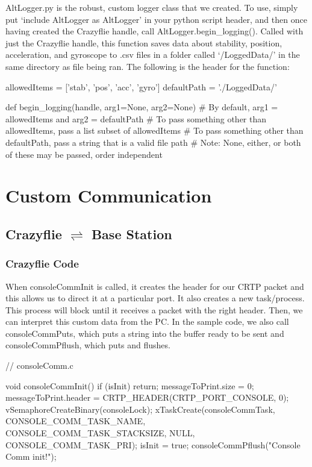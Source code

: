 \documentclass[]{article}
\begin{document}
\noindent AltLogger.py is the robust, custom logger class that we created. To use, simply put `include AltLogger as AltLogger' in your python script header, and then once having created the Crazyflie handle, call AltLogger.begin\_logging(). Called with just the Crazyflie handle, this function saves data about stability, position, acceleration, and gyroscope to .csv files in a folder called `/LoggedData/' in the same directory as file being ran. The following is the header for the function:

\begin{Python}
allowedItems = ['stab', 'pos', 'acc', 'gyro']
defaultPath = './LoggedData/'
	
def begin_logging(handle, arg1=None, arg2=None)
# By default, arg1 = allowedItems and arg2 = defaultPath
# To pass something other than allowedItems, pass a list subset of allowedItems
# To pass something other than defaultPath, pass a string that is a valid file path
# Note: None, either, or both of these may be passed, order independent
\end{Python}

\section{Custom Communication}

\subsection{\texorpdfstring{Crazyflie $\rightleftharpoons$ Base Station}%
	{Between Crazyflie and Base Station}}

\subsubsection{Crazyflie Code}

\noindent When consoleCommInit is called, it creates the header for our CRTP packet and this allows us to direct it at a particular port. It also creates a new task/process. This process will block until it receives a packet with the right header. Then, we can interpret this custom data from the PC. In the sample code, we also call consoleCommPuts, which puts a string into the buffer ready to be sent and consoleCommPflush, which puts and flushes.

\begin{C}
// consoleComm.c

void consoleCommInit() {
	if (isInit) return;
	messageToPrint.size = 0;
	messageToPrint.header = CRTP_HEADER(CRTP_PORT_CONSOLE, 0);
	vSemaphoreCreateBinary(consoleLock);
	xTaskCreate(consoleCommTask, CONSOLE_COMM_TASK_NAME,
	CONSOLE_COMM_TASK_STACKSIZE, NULL, CONSOLE_COMM_TASK_PRI);
	isInit = true;
	consoleCommPflush("Console Comm init!");
}
\end{C}
\end{document}
